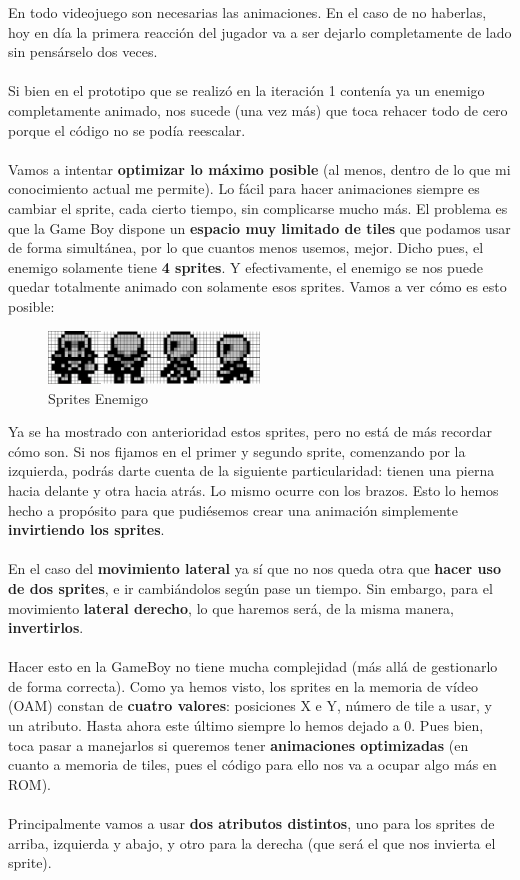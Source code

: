 En todo videojuego son necesarias las animaciones. En el caso de no haberlas, hoy en día la primera reacción del jugador va a ser dejarlo completamente de lado sin pensárselo dos veces.
\\ \\
Si bien en el prototipo que se realizó en la iteración 1 contenía ya un enemigo completamente animado, nos sucede (una vez más) que toca rehacer todo de cero porque el código no se podía reescalar.
\\ \\
Vamos a intentar \textbf{optimizar lo máximo posible} (al menos, dentro de lo que mi conocimiento actual me permite). Lo fácil para hacer animaciones siempre es cambiar el sprite, cada cierto tiempo, sin complicarse mucho más. El problema es que la Game Boy dispone un \textbf{espacio muy limitado de tiles} que podamos usar de forma simultánea, por lo que cuantos menos usemos, mejor.
\clearpage
Dicho pues, el enemigo solamente tiene \textbf{4 sprites}. Y efectivamente, el enemigo se nos puede quedar totalmente animado con solamente esos sprites. Vamos a ver cómo es esto posible:

\begin{figure}[h]
\centering
\includegraphics[width=0.5\textwidth]{include/images/desarrollo/animation.png}
\caption{Sprites Enemigo}
\label{figure:animation}
\end{figure}

Ya se ha mostrado con anterioridad estos sprites, pero no está de más recordar cómo son. Si nos fijamos en el primer y segundo sprite, comenzando por la izquierda, podrás darte cuenta de la siguiente particularidad: tienen una pierna hacia delante y otra hacia atrás. Lo mismo ocurre con los brazos. Esto lo hemos hecho a propósito para que pudiésemos crear una animación simplemente \textbf{invirtiendo los sprites}.
\\ \\
En el caso del \textbf{movimiento lateral} ya sí que no nos queda otra que \textbf{hacer uso de dos sprites}, e ir cambiándolos según pase un tiempo. Sin embargo, para el movimiento \textbf{lateral derecho}, lo que haremos será, de la misma manera, \textbf{invertirlos}.
\\ \\
Hacer esto en la GameBoy no tiene mucha complejidad (más allá de gestionarlo de forma correcta). Como ya hemos visto, los sprites en la memoria de vídeo (OAM) constan de \textbf{cuatro valores}: posiciones X e Y, número de tile a usar, y un atributo. Hasta ahora este último siempre lo hemos dejado a 0. Pues bien, toca pasar a manejarlos si queremos tener \textbf{animaciones optimizadas} (en cuanto a memoria de tiles, pues el código para ello nos va a ocupar algo más en ROM).
\\ \\
Principalmente vamos a usar \textbf{dos atributos distintos}, uno para los sprites de arriba, izquierda y abajo, y otro para la derecha (que será el que nos invierta el sprite).

